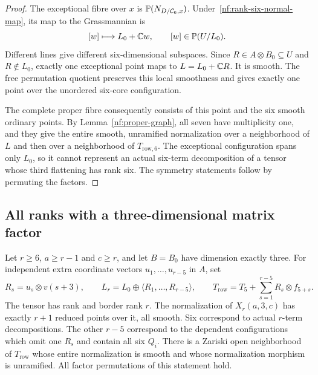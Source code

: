 \begin{proof}
The exceptional fibre over $x$ is $\mathbb P(N_{D/\mathcal C_6,x})$.
Under~\eqref{nf:rank-six-normal-map}, its map to the Grassmannian is
\[
 [w]\longmapsto L_0+\mathbb C w,\qquad [w]\in\mathbb P(U/L_0).
\]
Different lines give different six-dimensional subspaces. Since
$R\in A\otimes B_0\subseteq U$ and $R\notin L_0$, exactly one
exceptional point maps to $L=L_0+\mathbb C R$. It is smooth. The free
permutation quotient preserves this local smoothness and gives
exactly one point over the unordered six-core configuration.

The complete proper fibre consequently consists of this point and
the six smooth ordinary points. By Lemma~\ref{nf:proper-graph},
all seven have multiplicity one, and they give the entire smooth,
unramified normalization over a neighborhood of $L$ and then over
a neighborhood of $T_{\mathrm{row},6}$. The exceptional configuration
spans only $L_0$, so it cannot represent an actual six-term
decomposition of a tensor whose third flattening has rank six.
The symmetry statements follow by permuting the factors.
\end{proof}

\subsection{All ranks with a three-dimensional matrix factor}
\label{nf:three-factor-subsection}

\begin{theorem}
\label{nf:three-factor}
Let $r\geq6$, $a\geq r-1$ and $c\geq r$, and let $B=B_0$ have
dimension exactly three. For independent extra coordinate vectors
$u_1,\ldots,u_{r-5}$ in $A$, set
\begin{equation}\label{nf:row-data}
 R_s=u_s\otimes v(s+3),\qquad
 L_r=L_0\oplus\langle R_1,\ldots,R_{r-5}\rangle,\qquad
 T_{\mathrm{row}}=T_5+\sum_{s=1}^{r-5}R_s\otimes f_{5+s}.
\end{equation}
The tensor has rank and border rank $r$. The normalization of
$X_r(a,3,c)$ has exactly $r+1$ reduced points over it, all smooth.
Six correspond to actual $r$-term decompositions. The other $r-5$
correspond to the dependent configurations which omit one $R_s$
and contain all six $Q_i$. There is a Zariski open neighborhood of
$T_{\mathrm{row}}$ whose entire normalization is smooth and whose
normalization morphism is unramified. All factor permutations of
this statement hold.
\end{theorem}


